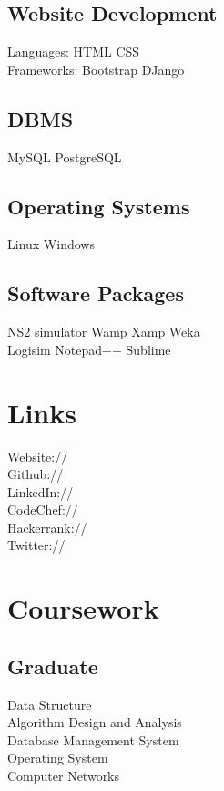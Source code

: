\documentclass[]{resume-openfont}
\begin{document}
\begin{minipage}[t]{0.33\textwidth}
\subsection{Website Development}
Languages: HTML \textbullet{} CSS \\
Frameworks: Bootstrap \textbullet{} DJango
\sectionsep
\subsection{DBMS}
MySQL \textbullet{} PostgreSQL
\sectionsep
\subsection{Operating Systems}
Linux \textbullet{} Windows
\sectionsep
\subsection{Software Packages}
NS2 simulator \textbullet{} Wamp \textbullet{} Xamp \textbullet{} Weka \\ Logisim \textbullet{} Notepad++ \textbullet{} Sublime 
\sectionsep



\section{Links}
Website:// \href{https://diksha-rathi.github.io}{} \\
Github:// \href{https://github.com/Diksha-Rathi}{} \\
LinkedIn://  \href{https://www.linkedin.com/in/diksharathi}{} \\
CodeChef://  \href{https://www.codechef.com/users/codegirl1995}{} \\
Hackerrank://  \href{https://www.hackerrank.com/codegirl1995}{} \\
Twitter://  \href{https://twitter.com/diksha_28795}{} \\
\sectionsep


\section{Coursework}
\subsection{Graduate}
Data Structure \\
Algorithm Design and Analysis \\
Database Management System \\
Operating System \\
Computer Networks
\sectionsep

%
%

\end{minipage} 
\end{document}

